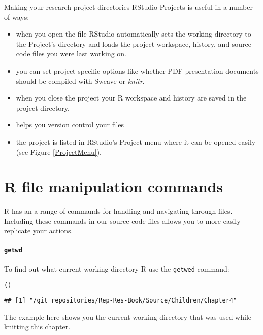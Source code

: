 {Making your research project directories RStudio Projects is useful in a number of ways:

\begin{itemize}
    \item when you open the  file RStudio automatically sets the working directory to the Project's directory and loads the project workspace, history, and source code files you were last working on.
    \item you can set project specific options like whether PDF presentation documents should be compiled with Sweave or {\emph{knitr}}.
    \item when you close the project your R workspace and history are saved in the project directory,
    \item helps you version control your files
    \item the project is listed in RStudio's Project menu where it can be opened easily (see Figure \ref{ProjectMenu}).
\end{itemize}

\section{R file manipulation commands}

R has an a range of commands for handling and navigating through files. Including these commands in our source code files allows you to more easily replicate your actions.

\paragraph{{\tt{getwd}}}

To find out what current working directory R use the \texttt{getwed} command:

\begin{knitrout}
\color{fgcolor}\begin{kframe}
\begin{alltt}
()
\end{alltt}
\begin{verbatim}
## [1] "/git_repositories/Rep-Res-Book/Source/Children/Chapter4"
\end{verbatim}
\end{kframe}
\end{knitrout}


\noindent The example here shows you the current working directory that was used while knitting this chapter.

}
